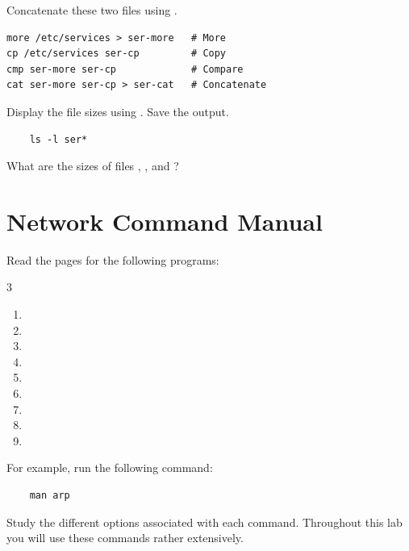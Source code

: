 \documentclass{../UTNetLab}
\begin{document}
Concatenate these two files using .

\begin{lstlisting}
more /etc/services > ser-more   # More
cp /etc/services ser-cp         # Copy
cmp ser-more ser-cp             # Compare
cat ser-more ser-cp > ser-cat   # Concatenate
\end{lstlisting}

Display the file sizes using .
Save the output.

\begin{lstlisting}
	ls -l ser*
\end{lstlisting}

\begin{report}
    \item What are the sizes of files , , and ?
\end{report}

\section{Network Command Manual}
Read the  pages for the following programs:
\begin{multicols}{3}
    \begin{enumerate}
        \item {}
        \item {}
        \item {}
        \item {}
        \item {}
        \item {}
        \item {}
        \item {}
        \item {}
    \end{enumerate}
\end{multicols}

For example,  run the following command:

\begin{lstlisting}
	man arp
\end{lstlisting}

Study the different options associated with each command.
Throughout this lab you will use these commands rather extensively.
\end{document}
